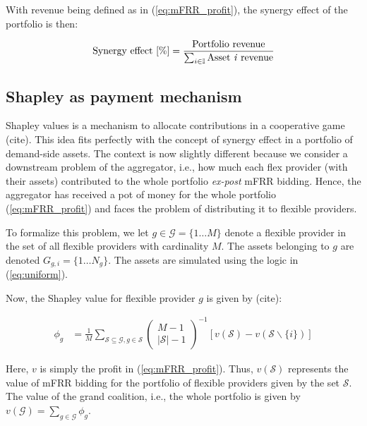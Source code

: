 \documentclass[lettersize,journal]{IEEEtran}
\begin{document}
With revenue being defined as in (\ref{eq:mFRR_profit}), the synergy effect of the portfolio is then:

\begin{align}\label{eq:synergy_effect}
    \text{Synergy effect [\%]} = \frac{ \text{Portfolio revenue} }{ \sum_{i \in \mathbb{I}} \text{Asset \textit{i} revenue} }
\end{align}


\subsection{Shapley as payment mechanism}

Shapley values is a mechanism to allocate contributions in a cooperative game (cite). This idea fits perfectly with the concept of synergy effect in a portfolio of demand-side assets. The context is now slightly different because we consider a downstream problem of the aggregator, i.e., how much each flex provider (with their assets) contributed to the whole portfolio \textit{ex-post} mFRR bidding. Hence, the aggregator has received a pot of money for the whole portfolio (\ref{eq:mFRR_profit}) and faces the problem of distributing it to flexible providers.

To formalize this problem, we let $g \in \mathcal{G} = \{1 \hdots M \}$ denote a flexible provider in the set of all flexible providers with cardinality $M$. The assets belonging to $g$ are denoted $G_{g,i} = \{1 \hdots N_g \}$. The assets are simulated using the logic in (\ref{eq:uniform}).

Now, the Shapley value for flexible provider $g$ is given by (cite):

\begin{align}\label{eq:shap}
    \phi_g & = \frac{1}{M} \sum_{\mathcal{S} \subseteq \mathcal{G}, g \in \mathcal{S}}\left(\begin{array}{c}
                                                                                                    M-1 \\
                                                                                                    |\mathcal{S}|-1
                                                                                                \end{array}\right)^{-1}[v(\mathcal{S})-v(\mathcal{S} \backslash\{i\})]
\end{align}

Here, $v$ is simply the profit in (\ref{eq:mFRR_profit}). Thus, $v(\mathcal{S})$ represents the value of mFRR bidding for the portfolio of flexible providers given by the set $\mathcal{S}$. The value of the grand coalition, i.e., the whole portfolio is given by $v(\mathcal{G}) = \sum_{g \in \mathcal{G}} \phi_{g}$.
\end{document}
